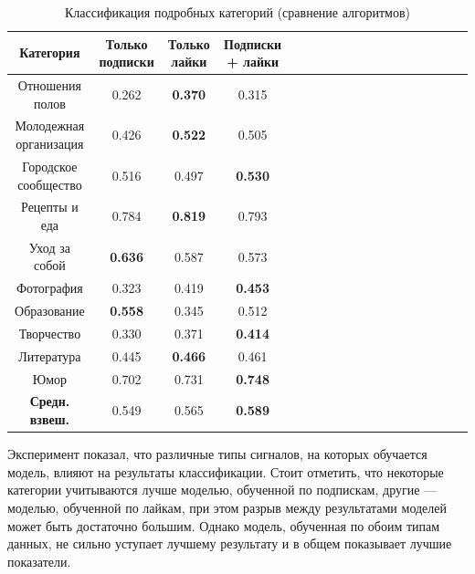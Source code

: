\documentclass[times,specification,annotation]{itmo-student-thesis}
\begin{document}
\begin{table}[!h]
\caption{Классификация подробных категорий (сравнение алгоритмов)}\label{tab-all-d}
\centering
\begin{tabular}{|*{18}{c|}}\hline
Категория & Только подписки  & Только лайки & Подписки + лайки \\\hline
Отношения полов          & 0.262 & \textbf{0.370} & 0.315  \\\hline
Молодежная организация           & 0.426 & \textbf{0.522} & 0.505  \\\hline
Городское сообщество           & 0.516 & 0.497 & \textbf{0.530} \\\hline
Рецепты и еда          & 0.784 & \textbf{0.819} & 0.793   \\\hline
Уход за собой          & \textbf{0.636} & 0.587 & 0.573  \\\hline
Фотография           & 0.323 & 0.419 & \textbf{0.453} \\\hline
Образование           & \textbf{0.558} & 0.345 & 0.512 \\\hline
Творчество           & 0.330 & 0.371 & \textbf{0.414} \\\hline
Литература          & 0.445 & \textbf{0.466} & 0.461 \\\hline
Юмор          & 0.702 & 0.731 & \textbf{0.748} \\\hline
\textbf{Средн. взвеш.}  & 0.549 & 0.565 & \textbf{0.589}  \\\hline
\end{tabular}
\end{table}

Эксперимент показал, что различные типы сигналов, на которых обучается модель, влияют на результаты классификации.  
Стоит отметить, что некоторые категории учитываются лучше моделью, обученной по подпискам, другие --- моделью, обученной по лайкам, при этом разрыв между результатами моделей может быть достаточно большим. Однако модель, обученная по обоим типам данных, не сильно уступает лучшему результату и в общем показывает лучшие показатели. 
\end{document}
